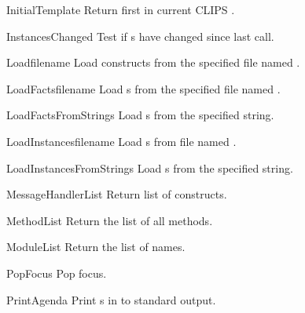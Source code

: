 \begin{funcdesc}{InitialTemplate}{}
Return first  in current CLIPS .
\end{funcdesc}

\begin{funcdesc}{InstancesChanged}{}
Test if s have changed since last call.
\end{funcdesc}

\begin{funcdesc}{Load}{filename}
Load constructs from the specified file named .
\end{funcdesc}

\begin{funcdesc}{LoadFacts}{filename}
Load s from the specified file named .
\end{funcdesc}

\begin{funcdesc}{LoadFactsFromString}{s}
Load s from the specified string.
\end{funcdesc}

\begin{funcdesc}{LoadInstances}{filename}
Load s from file named .
\end{funcdesc}

\begin{funcdesc}{LoadInstancesFromString}{s}
Load s from the specified string.
\end{funcdesc}

\begin{funcdesc}{MessageHandlerList}{}
Return list of  constructs.
\end{funcdesc}

\begin{funcdesc}{MethodList}{}
Return the list of all methods.
\end{funcdesc}

\begin{funcdesc}{ModuleList}{}
Return the list of  names.
\end{funcdesc}

\begin{funcdesc}{PopFocus}{}
Pop focus.
\end{funcdesc}

\begin{funcdesc}{PrintAgenda}{}
Print s in  to standard output.
\end{funcdesc}

